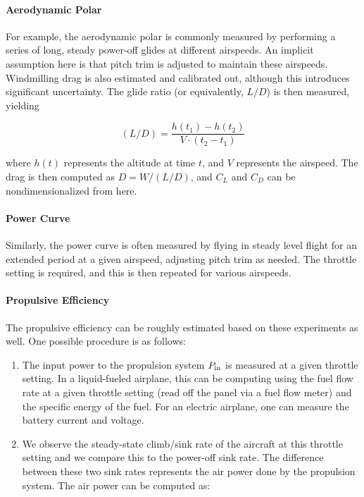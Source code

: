 \documentclass[11pt]{article}
\providecommand{\tightlist}{%
      \setlength{\itemsep}{0pt}\setlength{\parskip}{0pt}}
\begin{document}
    \hypertarget{aerodynamic-polar}{%
\paragraph{Aerodynamic Polar}\label{aerodynamic-polar}}

For example, the aerodynamic polar is commonly measured by performing a
series of long, steady power-off glides at different airspeeds. An
implicit assumption here is that pitch trim is adjusted to maintain
these airspeeds. Windmilling drag is also estimated and calibrated out,
although this introduces significant uncertainty. The glide ratio (or
equivalently, \(L/D\)) is then measured, yielding

\[(L/D) = \frac{h(t_1) - h(t_2)}{V \cdot (t_2 - t_1)}\]

where \(h(t)\) represents the altitude at time \(t\), and \(V\)
represents the airspeed. The drag is then computed as \(D = W / (L/D)\),
and \(C_L\) and \(C_D\) can be nondimensionalized from here.

    \hypertarget{power-curve}{%
\paragraph{Power Curve}\label{power-curve}}

Similarly, the power curve is often measured by flying in steady level
flight for an extended period at a given airspeed, adjusting pitch trim
as needed. The throttle setting is required, and this is then repeated
for various airspeeds.

    \hypertarget{propulsive-efficiency}{%
\paragraph{Propulsive Efficiency}\label{propulsive-efficiency}}

The propulsive efficiency can be roughly estimated based on these
experiments as well. One possible procedure is as follows:

\begin{enumerate}
\def\labelenumi{\arabic{enumi}.}
\tightlist
\item
  The input power to the propulsion system \(P_{\rm in}\) is measured at
  a given throttle setting. In a liquid-fueled airplane, this can be
  computing using the fuel flow rate at a given throttle setting (read
  off the panel via a fuel flow meter) and the specific energy of the
  fuel. For an electric airplane, one can measure the battery current
  and voltage.
\item
  We observe the steady-state climb/sink rate of the aircraft at this
  throttle setting and we compare this to the power-off sink rate. The
  difference between these two sink rates represents the air power done
  by the propulsion system. The air power can be computed as:
\end{enumerate}
\end{document}
